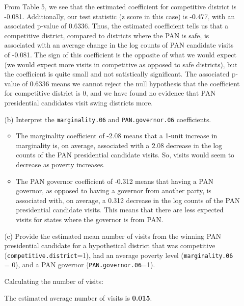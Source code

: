 \documentclass[12pt,letterpaper]{article}
\begin{document}
\begin{enumerate}
	\vspace{.5cm}
	\noindent From Table 5, we see that the estimated coefficient for competitive district is -0.081. Additionally, our test statistic (z score in this case) is -0.477, with an associated p-value of 0.6336. Thus, the estimated coefficient tells us that a competitive district, compared to districts where the PAN is safe, is associated with an average change in the log counts of PAN candidate visits of -0.081. The sign of this coefficient is the opposite of what we would expect (we would expect more visits in competitive as opposed to safe districts), but the coefficient is quite small and not satistically significant. The associated p-value of 0.6336 means we cannot reject the null hypothesis that the coefficient for competitive district is 0, and we have found no evidence that PAN presidential candidates visit swing districts more.
	
	\newpage
	\item [(b)]
	Interpret the \texttt{marginality.06} and \texttt{PAN.governor.06} coefficients.
	
	\vspace{0.5cm}
	
	\begin{itemize}
		\item The marginality coefficient of -2.08 means that a 1-unit increase in marginality is, on average, associated with a 2.08 decrease in the log counts of the PAN presidential candidate visits. So, visits would seem to decrease as poverty increases. 
		\item The PAN governor coefficient of -0.312 means that having a PAN governor, as opposed to having a governor from another party, is associated with, on average, a 0.312 decrease in the log counts of the PAN presidential candidate visits. This means that there are less expected visits for states where the governor is from PAN. 
	\end{itemize}
	
	\item [(c)]
	Provide the estimated mean number of visits from the winning PAN presidential candidate for a hypothetical district that was competitive (\texttt{competitive.district}=1), had an average poverty level (\texttt{marginality.06} = 0), and a PAN governor (\texttt{PAN.governor.06}=1).
	
	\vspace{0.5cm}
	\noindent Calculating the number of visits: 
	
	
	\vspace{.25cm}
	
	\noindent The estimated average number of visits is \textbf{0.015}.

\end{enumerate}
\end{document}
